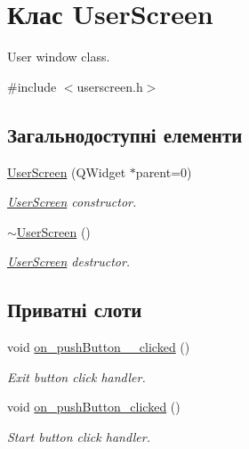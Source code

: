 \hypertarget{classUserScreen}{\section{Клас User\-Screen}
\label{classUserScreen}
}


User window class.  




{\ttfamily \#include $<$userscreen.\-h$>$}

\subsection*{Загальнодоступні елементи}
\begin{DoxyCompactItemize}
\item 
\hyperlink{classUserScreen_a27136456b8f1b4d10dfe1cbfc9c43d7c}{User\-Screen} (Q\-Widget $\ast$parent=0)
\begin{DoxyCompactList}\small\item\em \hyperlink{classUserScreen}{User\-Screen} constructor. \end{DoxyCompactList}\item 
\hypertarget{classUserScreen_a30ef13619f5f42c72064ccd57df79e82}{\hyperlink{classUserScreen_a30ef13619f5f42c72064ccd57df79e82}{$\sim$\-User\-Screen} ()}\label{classUserScreen_a30ef13619f5f42c72064ccd57df79e82}

\begin{DoxyCompactList}\small\item\em \hyperlink{classUserScreen}{User\-Screen} destructor. \end{DoxyCompactList}\end{DoxyCompactItemize}
\subsection*{Приватні слоти}
\begin{DoxyCompactItemize}
\item 
\hypertarget{classUserScreen_a6e25c29ff53726317f4056b66fcb9a18}{void \hyperlink{classUserScreen_a6e25c29ff53726317f4056b66fcb9a18}{on\-\_\-push\-Button\-\_\-\_\-clicked} ()}\label{classUserScreen_a6e25c29ff53726317f4056b66fcb9a18}

\begin{DoxyCompactList}\small\item\em Exit button click handler. \end{DoxyCompactList}\item 
\hypertarget{classUserScreen_a6e79ba614aa7a1af1520cc78d5e7c264}{void \hyperlink{classUserScreen_a6e79ba614aa7a1af1520cc78d5e7c264}{on\-\_\-push\-Button\-\_\-clicked} ()}\label{classUserScreen_a6e79ba614aa7a1af1520cc78d5e7c264}

\begin{DoxyCompactList}\small\item\em Start button click handler. \end{DoxyCompactList}\end{DoxyCompactItemize}
